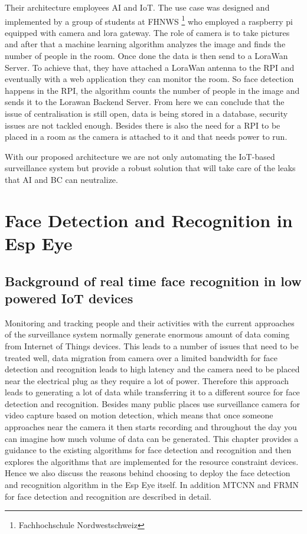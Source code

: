 Their architecture employees AI and IoT. The use case was designed and implemented by a group of students at FHNWS \footnote[1]{Fachhochschule Nordwestschweiz} who employed a raspberry pi equipped with camera and lora gateway. The role of camera is to take pictures and after that a machine learning algorithm analyzes the image and finds the number of people in the room. Once done the data is then send to a LoraWan Server. To achieve that, they have attached a LoraWan antenna to the RPI and eventually with a web application they can monitor the room. So face detection happens in the RPI, the algorithm counts the number of people in the image and sends it to the Lorawan Backend Server. From here we can conclude that the issue of centralisation is still open, data is being stored in a database, security issues are not tackled enough. Besides there is also the need for a RPI to be placed in a room as the camera is attached to it and that needs power to run. 

With our proposed architecture we are not only automating the IoT-based surveillance system but provide a robust solution that will take care of the leaks that AI and BC can neutralize. 


\chapter{Face Detection and Recognition in Esp Eye}
\label{chap:face_detection}
\section{Background of real time face recognition in low powered IoT devices}
Monitoring and tracking people and their activities with the current approaches of the surveillance system normally generate enormous amount of data coming from Internet of Things devices. This leads to a number of issues that need to be treated well, data migration from camera over a limited bandwidth for face detection and recognition leads to high latency and the camera need to be placed near the electrical plug as they require a lot of power. Therefore this approach leads to generating a lot of data while transferring it to a different source for face detection and recognition. Besides many public places use surveillance camera for video capture based on motion detection, which means that once someone approaches near the camera it then starts recording and throughout the day you can imagine how much volume of data can be generated. 
This chapter provides a guidance to the existing algorithms for face detection and recognition and then explores the algorithms that are implemented for the resource constraint devices. Hence we also discuss the reasons behind choosing to deploy the face detection and recognition algorithm in the Esp Eye itself. In addition MTCNN and FRMN for face detection and recognition are described in detail. 


